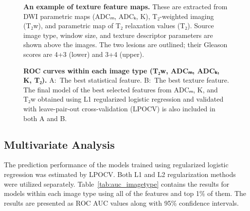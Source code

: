 \documentclass[10pt,letterpaper]{article}
\begin{document}
\begin{figure}[!ht]
    \centering
    \caption{{\bf An example of texture feature maps.}
    These are extracted from DWI parametric maps (ADCₘ, ADCₖ, K), T₂-weighted
    imaging (T₂w), and parametric map of T₂ relaxation values (T₂). Source image
    type, window size, and texture descriptor parameters are shown above the
    images. The two lesions are outlined; their Gleason scores are 4+3 (lower)
    and 3+4 (upper).}%
    \label{fig:tmap}
\end{figure}

\begin{figure}[!ht]
    \centering
    \caption{{\bf ROC curves within each image type (T₂w, ADCₘ, ADCₖ, K, T₂).}
    A:~The best statistical feature. B:~The best texture feature. The final
    model of the best selected features from ADCₘ, K, and T₂w obtained using L1
    regularized logistic regression and validated with leave-pair-out
    cross-validation (LPOCV) is also included in both A and B.}%
    \label{fig:roc}
\end{figure}


\subsection{Multivariate Analysis}

The prediction performance of the models trained using regularized logistic
regression was estimated by LPOCV\@. Both L1 and L2 regularization methods were
utilized separately. Table~\ref{tab:auc_imagetype} contains the results for
models within each image type using all of the features and top 1\% of them. The
results are presented as ROC AUC values along with 95\% confidence intervals.
\end{document}
